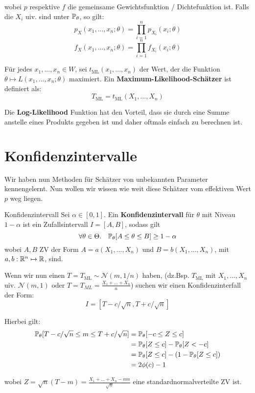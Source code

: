 wobei $p$ respektive $f$ die gemeinsame Gewichtsfunktion / Dichtefunktion ist. Falls die $X_i$ uiv. sind unter $\mathbb{P}_\theta$, so gilt:
$$p_X(x_1,...,x_n;\theta) = \prod_{i=1}^n p_{X_i}(x_i; \theta)$$ $$f_X(x_1,...,x_n;\theta) = \prod_{i=1}^n f_{X_i}(x_i; \theta)$$

Für jedes $x_1, ..., x_n \in W$, sei $t_{\text{ML}}(x_1, ..., x_n)$ der Wert, der die Funktion $\theta \mapsto L(x_1, ..., x_n; \theta)$ maximiert. Ein \textbf{Maximum-Likelihood-Schätzer} ist definiert als: 
$$T_{\text{ML}} = t_{\text{ML}}(X_1,...,X_n)$$

Die \textbf{Log-Likelihood} Funktion hat den Vorteil, dass sie durch eine Summe anstelle eines Produkts gegeben ist und daher oftmals einfach zu berechnen ist.


\section{Konfidenzintervalle}

Wir haben nun Methoden für Schätzer von unbekannten Parameter kennengelernt. Nun wollen wir wissen wie weit diese Schätzer vom effektiven Wert $p$ weg liegen.

\begin{mainbox}{Konfidenzintervall}
    Sei $\alpha \in [0,1]$. Ein \textbf{Konfidenzintervall} für $\theta$ mit Niveau $1 - \alpha$ ist ein Zufallsintervall $I = [A, B]$, sodass gilt 
    $$\forall \theta \in \Theta. \quad \mathbb{P}_\theta[A \leq \theta \leq B] \geq 1 - \alpha$$
    wobei $A,B$ ZV der Form $A = a (X_1, ..., X_n)$ und $B = b (X_1, ..., X_n)$, mit $a,b : \mathbb{R}^n \mapsto \mathbb{R}$, sind.
\end{mainbox}

Wenn wir nun einen $T = T_{\text{ML}} \sim \mathcal{N}(m, 1/n)$ haben, (dz.Bsp. $T_{\text{ML}}$ mit $X_1,...,X_n$ uiv. $\mathcal{N}(m, 1)$ oder $T = T_{ML} = \frac{X_1 + \ldots + X_n}{n}$) suchen wir einen Konfidenzinterfall der Form: 
$$I = [T - c/\sqrt{n}, T + c / \sqrt{n}]$$

Hierbei gilt:
\begin{align*}\mathbb{P}_\theta[T - c/\sqrt{n} \leq m \leq T + c/\sqrt{n}] &= \mathbb{P}_\theta[-c \leq Z \leq c] \\ &= \mathbb{P}_\theta[Z \leq c] - \mathbb{P}_\theta[Z < -c] \\ &= \mathbb{P}_\theta[Z \leq c] - (1 - \mathbb{P}_\theta[Z \leq c]) \\ &= 2\phi(c) - 1\end{align*}

wobei $Z = \sqrt{n}(T-m) =  \frac{X_1 + \ldots + X_n - mn}{\sqrt{n}}$ eine standardnormalverteilte ZV ist.

